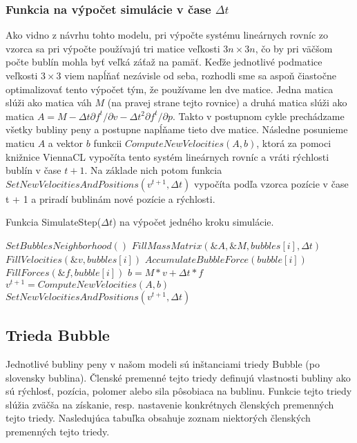 \subsubsection{Funkcia na výpočet simulácie v čase $\Delta t$}

Ako vidno z návrhu tohto modelu, pri výpočte systému lineárnych rovníc zo vzorca  sa pri výpočte používajú tri matice veľkosti $3n \times 3n$, čo by pri väčšom počte bublín mohla byť veľká záťaž na pamäť. Keďže jednotlivé podmatice veľkosti $3 \times 3$ viem napĺňať nezávisle od seba, rozhodli sme sa aspoň čiastočne optimalizovať tento výpočet tým, že používame len dve matice. Jedna matica slúži ako matica váh $M$ (na pravej strane tejto rovnice) a druhá matica slúži ako matica $A = M - \Delta t\partial f^{t}/\partial v - \Delta t^{2}\partial f^{t}/\partial p$. Takto v postupnom cykle prechádzame všetky bubliny peny a postupne napĺňame tieto dve matice. Následne posunieme maticu $A$ a vektor $b$ funkcii $ComputeNewVelocities(A, b)$, ktorá za pomoci knižnice ViennaCL \cite{viennacl} vypočíta tento systém lineárnych rovníc a vráti rýchlosti bublín v čase $t + 1$. Na základe nich potom funkcia $SetNewVelocitiesAndPositions(v^{t+1}, \Delta t)$ vypočíta podľa vzorca  pozície v čase t + 1 a priradí bublinám nové pozície a rýchlosti.

\begin{algorithm}
	\caption{Funkcia SimulateStep($\Delta t$) na výpočet jedného kroku simulácie.}
	\label{alg:simulation}
	\begin{algorithmic}
		\STATE $SetBubblesNeighborhood()$
			\STATE $FillMassMatrix(\&A, \&M, bubbles[i], \Delta t)$
			\STATE $FillVelocities(\&v, bubbles[i])$
			\STATE $AccumulateBubbleForce(bubble[i])$
			\STATE $FillForces(\&f, bubble[i])$
		\ENDFOR
		\STATE $b = M \ast v + \Delta t \ast f$
		\STATE $v^{t+1} = ComputeNewVelocities(A, b)$
		\STATE $SetNewVelocitiesAndPositions(v^{t+1}, \Delta t)$
	\end{algorithmic}
\end{algorithm}

\subsection{Trieda Bubble}

Jednotlivé bubliny peny v našom modeli sú inštanciami triedy Bubble (po slovensky bublina). Členské premenné tejto triedy definujú vlastnosti bubliny ako sú rýchlosť, pozícia, polomer alebo sila pôsobiaca na bublinu. Funkcie tejto triedy slúžia zväčša na získanie, resp. nastavenie konkrétnych členských premenných tejto triedy. Nasledujúca tabuľka obsahuje zoznam niektorých členských premenných tejto triedy.

